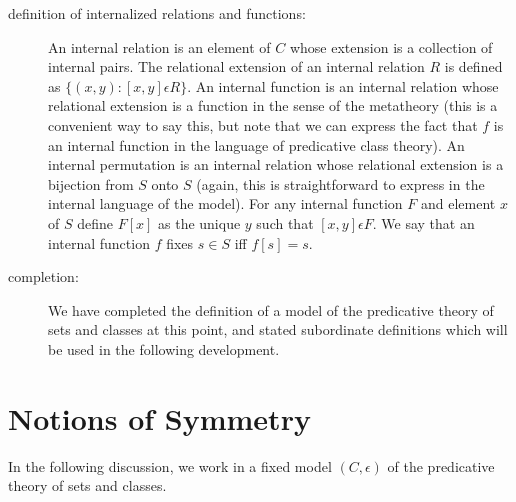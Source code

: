 \documentclass[12pt]{article}
\begin{document}
\begin{description}
\begin{description}
\item[definition of internalized relations and functions:]   An internal relation is an element of $C$ whose extension is a collection of internal pairs.   The relational extension of an internal relation $R$
is defined as $\{(x,y):[x,y] \epsilon R\}$.   An internal function is an internal relation whose relational extension is a function in the sense of the metatheory (this is a convenient way to say this, but note that we can express the fact that $f$ is an internal function in the language of predicative class theory).   An internal permutation is an internal relation whose relational extension is a bijection from $S$ onto $S$ (again, this is straightforward to express in the internal language of the model).    For any internal function $F$ and element $x$ of $S$ define $F[x]$ as the unique $y$ such that $[x,y]\epsilon F$.  We say that an internal function $f$ fixes $s \in S$ iff $f[s]=s$.

\item[completion:]  We have completed the definition of a model of the predicative theory of sets and classes at this point, and stated subordinate definitions which will be used in the following development.

\end{description}

\end{description}

\newpage

\section{Notions of Symmetry}

In the following discussion, we work in a fixed model $(C,\epsilon)$ of the predicative theory of sets and classes.
\end{document}
